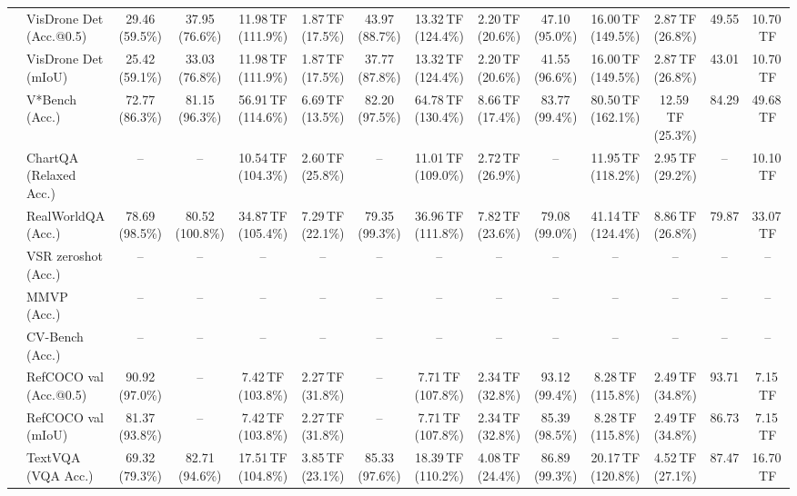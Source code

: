 \begin{table}[t]
\begin{center}
\begin{small}
\begin{sc}
{\begin{tabular}{llcccccccccccc}
& VisDrone Det (Acc.@0.5) & 29.46 (59.5\%) & 37.95 (76.6\%) & 11.98\,TF (111.9\%) & 1.87\,TF (17.5\%) & 43.97 (88.7\%) & 13.32\,TF (124.4\%) & 2.20\,TF (20.6\%) & 47.10 (95.0\%) & 16.00\,TF (149.5\%) & 2.87\,TF (26.8\%) & 49.55 & 10.70\,TF \\
& VisDrone Det (mIoU) & 25.42 (59.1\%) & 33.03 (76.8\%) & 11.98\,TF (111.9\%) & 1.87\,TF (17.5\%) & 37.77 (87.8\%) & 13.32\,TF (124.4\%) & 2.20\,TF (20.6\%) & 41.55 (96.6\%) & 16.00\,TF (149.5\%) & 2.87\,TF (26.8\%) & 43.01 & 10.70\,TF \\
& V*Bench (Acc.) & 72.77 (86.3\%) & 81.15 (96.3\%) & 56.91\,TF (114.6\%) & 6.69\,TF (13.5\%) & 82.20 (97.5\%) & 64.78\,TF (130.4\%) & 8.66\,TF (17.4\%) & 83.77 (99.4\%) & 80.50\,TF (162.1\%) & 12.59\,TF (25.3\%) & 84.29 & 49.68\,TF \\
\midrule
{}
& ChartQA (Relaxed Acc.) & -- & -- & 10.54\,TF (104.3\%) & 2.60\,TF (25.8\%) & -- & 11.01\,TF (109.0\%) & 2.72\,TF (26.9\%) & -- & 11.95\,TF (118.2\%) & 2.95\,TF (29.2\%) & -- & 10.10\,TF \\
& RealWorldQA (Acc.) & 78.69 (98.5\%) & 80.52 (100.8\%) & 34.87\,TF (105.4\%) & 7.29\,TF (22.1\%) & 79.35 (99.3\%) & 36.96\,TF (111.8\%) & 7.82\,TF (23.6\%) & 79.08 (99.0\%) & 41.14\,TF (124.4\%) & 8.86\,TF (26.8\%) & 79.87 & 33.07\,TF \\
& VSR zeroshot (Acc.) & -- & -- & -- & -- & -- & -- & -- & -- & -- & -- & -- & -- \\
& MMVP (Acc.) & -- & -- & -- & -- & -- & -- & -- & -- & -- & -- & -- & -- \\
& CV-Bench (Acc.) & -- & -- & -- & -- & -- & -- & -- & -- & -- & -- & -- & -- \\
& RefCOCO val (Acc.@0.5) & 90.92 (97.0\%) & -- & 7.42\,TF (103.8\%) & 2.27\,TF (31.8\%) & -- & 7.71\,TF (107.8\%) & 2.34\,TF (32.8\%) & 93.12 (99.4\%) & 8.28\,TF (115.8\%) & 2.49\,TF (34.8\%) & 93.71 & 7.15\,TF \\
& RefCOCO val (mIoU) & 81.37 (93.8\%) & -- & 7.42\,TF (103.8\%) & 2.27\,TF (31.8\%) & -- & 7.71\,TF (107.8\%) & 2.34\,TF (32.8\%) & 85.39 (98.5\%) & 8.28\,TF (115.8\%) & 2.49\,TF (34.8\%) & 86.73 & 7.15\,TF \\
& TextVQA (VQA Acc.) & 69.32 (79.3\%) & 82.71 (94.6\%) & 17.51\,TF (104.8\%) & 3.85\,TF (23.1\%) & 85.33 (97.6\%) & 18.39\,TF (110.2\%) & 4.08\,TF (24.4\%) & 86.89 (99.3\%) & 20.17\,TF (120.8\%) & 4.52\,TF (27.1\%) & 87.47 & 16.70\,TF \\

\end{tabular}}
\end{sc}
\end{small}
\end{center}
\end{table}
